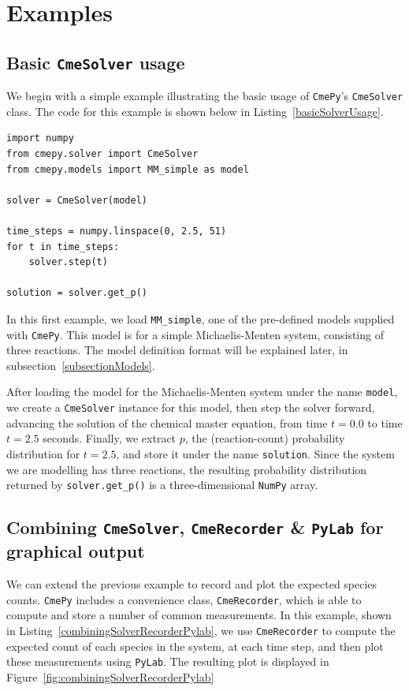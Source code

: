 \documentclass{article}
\newcommand{\mono}[1]{\texttt{#1}}
\newcommand{\cmepy}{\mono{CmePy}}
\newcommand{\numpy}{\mono{NumPy}}
\newcommand{\pylab}{\mono{PyLab}}
\newcommand{\lstref}[1]{Listing~\ref{#1}}
\newcommand{\figref}[1]{Figure~\ref{#1}}
\begin{document}
\section{Examples}

\subsection{Basic \mono{CmeSolver} usage}

We begin with a simple example illustrating the basic usage of \cmepy{}'s
\mono{CmeSolver} class. The code for this example is shown below in
\lstref{basicSolverUsage}.

\begin{lstlisting}[frame=tb,
caption={Example: solving a model},
label=basicSolverUsage
]
import numpy
from cmepy.solver import CmeSolver
from cmepy.models import MM_simple as model

solver = CmeSolver(model)

time_steps = numpy.linspace(0, 2.5, 51)
for t in time_steps:
    solver.step(t)

solution = solver.get_p()
\end{lstlisting}

In this first example, we load \mono{MM\_simple}, one of the pre-defined models
supplied with \cmepy{}. This model is for a simple Michaelis-Menten system,
consisting of three reactions. The model definition format will be explained
later, in subsection~\ref{subsectionModels}.

After loading the model for the Michaelis-Menten system under the name
\mono{model}, we create a \mono{CmeSolver} instance for this model, then step
the solver forward, advancing the solution of the chemical master equation,
from time $t = 0.0$ to time $t = 2.5$ seconds. Finally, we extract $p$, the
(reaction-count) probability distribution for $t = 2.5$, and store it under the
name \mono{solution}. Since the system we are modelling has three reactions,
the resulting probability distribution returned by \mono{solver.get\_p()} is a
three-dimensional \numpy{} array.

\subsection{Combining \mono{CmeSolver}, \mono{CmeRecorder} \& \pylab{} for
graphical output}

We can extend the previous example to record and plot the expected species
counts. \cmepy{} includes a convenience class, \mono{CmeRecorder}, which is
able to compute and store a number of common measurements. In this example,
shown in \lstref{combiningSolverRecorderPylab}, we use \mono{CmeRecorder} to
compute the expected count of each species in the system, at each time step,
and then plot these measurements using \pylab{}. The resulting plot is
displayed in \figref{fig:combiningSolverRecorderPylab}
\end{document}
